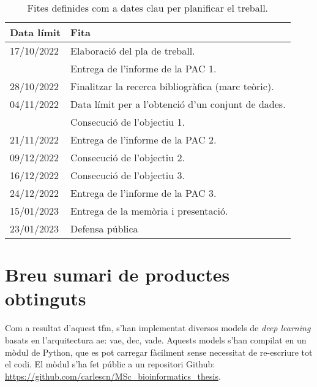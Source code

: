 \documentclass[CAT,BIB]{TFUOC}%
\begin{document}
            \begin{table}[htbp]
                \small
                \centering
                \begin{tabular}{@{}ll@{}}
                    \toprule
                    \textbf{Data límit} & \textbf{Fita} \\ \midrule
                    17/10/2022 & Elaboració del pla de treball.\\
                               & Entrega de l'informe de la PAC 1.\\
                    28/10/2022 & Finalitzar la recerca bibliogràfica (marc teòric).\\
                    04/11/2022 & Data límit per a l'obtenció d'un conjunt de dades.\\
                               & Consecució de l'objectiu 1.\\
                    21/11/2022 & Entrega de l'informe de la PAC 2.\\
                    09/12/2022 & Consecució de l'objectiu 2.\\
                    16/12/2022 & Consecució de l'objectiu 3.\\
                    24/12/2022 & Entrega de l'informe de la PAC 3.\\
                    15/01/2023 & Entrega de la memòria i presentació.\\
                    23/01/2023 & Defensa pública\\ \bottomrule
                \end{tabular}
                \caption[Fites i dates clau]{Fites definides com a dates clau per planificar el treball.}
                \label{t:fites}
            \end{table}


    \section{Breu sumari de productes obtinguts}

        Com a resultat d'aquest \gls{tfm},
        s'han implementat diversos models de \textit{deep learning}
        basats en l'arquitectura \gls{ae}:
        \gls{vae}, \gls{dec}, \gls{vade}.
        Aquests models s'han compilat en un mòdul de Python,
        que es pot carregar fàcilment sense necessitat de re-escriure tot el codi.
        El mòdul s'ha fet públic a un repositori Github:
        \url{https://github.com/carlescn/MSc_bioinformatics_thesis}.
\end{document}
